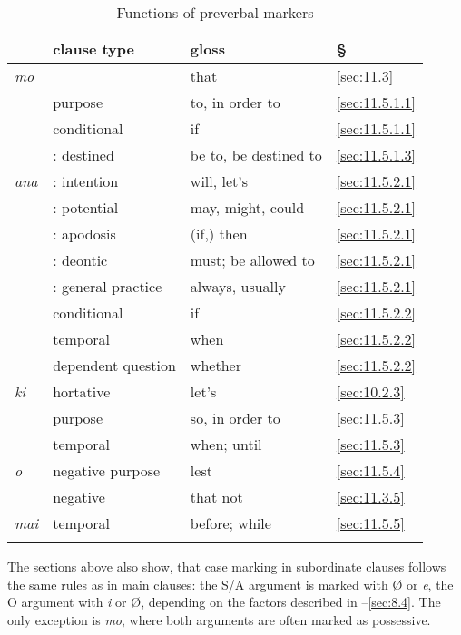 \begin{table}
\begin{tabularx}{\textwidth}{L{8mm}L{50mm}L{36mm}L{12mm}}
\lsptoprule
& {clause type} & {gloss} & {§}\\
\midrule
\textit{mo} &  & that & \ref{sec:11.3}\\
& purpose & to, in order to & \ref{sec:11.5.1.1}\\
& conditional & if & \ref{sec:11.5.1.1}\\
& : destined & be to, be destined to & \ref{sec:11.5.1.3}\\
\tablevspace
\textit{ana} & : intention & will, let’s & \ref{sec:11.5.2.1}\\
& : potential & may, might, could & \ref{sec:11.5.2.1}\\
& : apodosis & (if,) then & \ref{sec:11.5.2.1}\\
& : deontic & must; be allowed to & \ref{sec:11.5.2.1}\\
& : general practice & always, usually & \ref{sec:11.5.2.1}\\
& conditional & if & \ref{sec:11.5.2.2}\\
& temporal & when & \ref{sec:11.5.2.2}\\
& dependent question & whether & \ref{sec:11.5.2.2}\\
\tablevspace
\textit{ki} & hortative & let’s & \ref{sec:10.2.3}\\
& purpose & so, in order to & \ref{sec:11.5.3}\\
& temporal & when; until & \ref{sec:11.5.3}\\
\tablevspace
{\textit{{\ꞌ}o}} & negative purpose & lest & \ref{sec:11.5.4}\\
& negative  & that not & \ref{sec:11.3.5}\\
\tablevspace
{\textit{mai}} & temporal & before; while & \ref{sec:11.5.5}\\
\lspbottomrule
\end{tabularx}
\caption{Functions of preverbal markers}
\label{tab:67}
\end{table}

The sections above also show, that case marking in subordinate clauses follows the same rules as in main clauses: the S/A argument is marked with Ø or \textit{e}, the O argument with \textit{i} or Ø, depending on the factors described in –\ref{sec:8.4}. The only exception is \textit{mo}, where both arguments are often marked as possessive.

